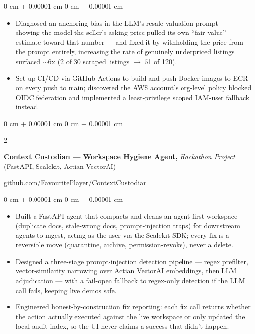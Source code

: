 \documentclass[10pt, letterpaper]{article}
\newenvironment{highlights}{
    \begin{itemize}[
        topsep=0.3 cm,
        parsep=0.05 cm,
        partopsep=0pt,
        itemsep=0.02 cm,
        leftmargin=0 cm + 10pt
    ]
}{
    \end{itemize}
} %
\newenvironment{onecolentry}{
    \begin{adjustwidth}{
        0 cm + 0.00001 cm
    }{
        0 cm + 0.00001 cm
    }
}{
    \end{adjustwidth}
} %
\newenvironment{extendedtwocolentry}[2][]{
    \onecolentry
    \def\secondColumn{#2}
    \setcolumnwidth{\fill, 8 cm}
    \begin{paracol}{2}
}{
    \switchcolumn \raggedleft \secondColumn
    \end{paracol}
    \endonecolentry
}
\begin{document}
\begin{onecolentry}
\begin{highlights}
                \item Diagnosed an anchoring bias in the LLM's resale-valuation prompt — showing the model the seller's asking price pulled its own ``fair value'' estimate toward that number — and fixed it by withholding the price from the prompt entirely, increasing the rate of genuinely underpriced listings surfaced $\sim$6x (2 of 30 scraped listings $\rightarrow$ 51 of 120).
                \item Set up CI/CD via GitHub Actions to build and push Docker images to ECR on every push to main; discovered the AWS account's org-level policy blocked OIDC federation and implemented a least-privilege scoped IAM-user fallback instead.
            \end{highlights}
        \end{onecolentry}

        \begin{extendedtwocolentry}{
            \href{https://github.com/FavouritePlayer/ContextCustodian}{github.com/FavouritePlayer/ContextCustodian}
        }
            \textbf{Context Custodian — Workspace Hygiene Agent,} \textit{Hackathon Project} (FastAPI, Scalekit, Actian VectorAI)
        \end{extendedtwocolentry}

        \vspace{0.10 cm}
        \begin{onecolentry}
            \begin{highlights}
                \item Built a FastAPI agent that compacts and cleans an agent-first workspace (duplicate docs, stale-wrong docs, prompt-injection traps) for downstream agents to ingest, acting as the user via the Scalekit SDK; every fix is a reversible move (quarantine, archive, permission-revoke), never a delete.
                \item Designed a three-stage prompt-injection detection pipeline — regex prefilter, vector-similarity narrowing over Actian VectorAI embeddings, then LLM adjudication — with a fail-open fallback to regex-only detection if the LLM call fails, keeping live demos safe.
                \item Engineered honest-by-construction fix reporting: each fix call returns whether the action actually executed against the live workspace or only updated the local audit index, so the UI never claims a success that didn't happen.
            \end{highlights}
        \end{onecolentry}
\end{document}
